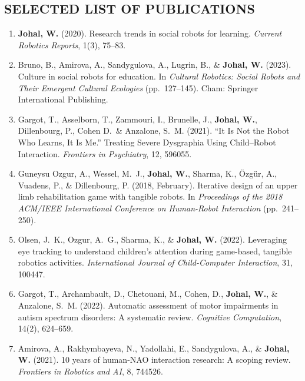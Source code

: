 
\subsection{SELECTED LIST OF PUBLICATIONS}
\vspace{2pt}

\begin{enumerate}[nosep]
    \item \textbf{Johal, W.} (2020). Research trends in social robots for learning. \textit{Current Robotics Reports}, 1(3), 75--83.
    \item Bruno, B., Amirova, A., Sandygulova, A., Lugrin, B., \& \textbf{Johal, W.} (2023). Culture in social robots for education. In \textit{Cultural Robotics: Social Robots and Their Emergent Cultural Ecologies} (pp.\ 127--145). Cham: Springer International Publishing.
    \item Gargot, T., Asselborn, T., Zammouri, I., Brunelle, J., \textbf{Johal, W.}, Dillenbourg, P., Cohen D.\ \& Anzalone, S.\ M. (2021). ``It Is Not the Robot Who Learns, It Is Me.'' Treating Severe Dysgraphia Using Child--Robot Interaction. \textit{Frontiers in Psychiatry}, 12, 596055.
    \item Guneysu Ozgur, A., Wessel, M.\ J., \textbf{Johal, W.}, Sharma, K., Özgür, A., Vuadens, P., \& Dillenbourg, P. (2018, February). Iterative design of an upper limb rehabilitation game with tangible robots. In \textit{Proceedings of the 2018 ACM/IEEE International Conference on Human-Robot Interaction} (pp.\ 241--250).
    \item Olsen, J.\ K., Ozgur, A.\ G., Sharma, K., \& \textbf{Johal, W.} (2022). Leveraging eye tracking to understand children's attention during game-based, tangible robotics activities. \textit{International Journal of Child-Computer Interaction}, 31, 100447.
    \item Gargot, T., Archambault, D., Chetouani, M., Cohen, D., \textbf{Johal, W.}, \& Anzalone, S.\ M. (2022). Automatic assessment of motor impairments in autism spectrum disorders: A systematic review. \textit{Cognitive Computation}, 14(2), 624--659.
    \item Amirova, A., Rakhymbayeva, N., Yadollahi, E., Sandygulova, A., \& \textbf{Johal, W.} (2021). 10 years of human-NAO interaction research: A scoping review. \textit{Frontiers in Robotics and AI}, 8, 744526.

\end{enumerate}
